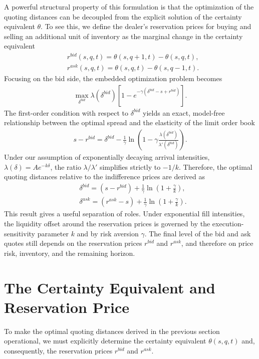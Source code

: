 \documentclass[a4paper,10pt,titlepage,oneside,openany]{book}
\theoremstyle{plain}\newtheorem{theorem}{Theorem}[chapter]
\theoremstyle{definition}\newtheorem{definition}{Definition}[chapter]
\theoremstyle{remark}\newtheorem{remark}{Remark}[chapter]
\begin{document}
A powerful structural property of this formulation is that the optimization of the quoting distances can be decoupled from the explicit solution of the certainty equivalent $\theta$. To see this, we define the dealer's reservation prices for buying and selling an additional unit of inventory as the marginal change in the certainty equivalent
\begin{align*}
    &r^{bid}(s,q,t) = \theta(s,q+1,t) - \theta(s,q,t),\\
    &r^{ask}(s,q,t) = \theta(s,q,t) - \theta(s,q-1,t).
\end{align*}
Focusing on the bid side, the embedded optimization problem becomes 
\begin{align*}
    \max_{\delta^{bid}} \lambda(\delta^{bid}) [1 - e^{-\gamma(\delta^{bid} - s + r^{bid})}].
\end{align*}
The first-order condition with respect to $\delta^{bid}$ yields an exact, model-free relationship between the optimal spread and the elasticity of the limit order book
\begin{align*}
    s - r^{bid} =\delta^{bid} - \frac{1}{\gamma} \ln \left( 1 - \gamma \frac{\lambda(\delta^{bid})}{\lambda'(\delta^{bid})} \right).
\end{align*}
Under our assumption of exponentially decaying arrival intensities, $\lambda(\delta) = A e^{-k\delta}$, the ratio $\lambda / \lambda'$ simplifies strictly to $-1/k$. Therefore, the optimal quoting distances relative to the indifference prices are derived as
\begin{align*}
    &\delta^{bid} = (s - r^{bid}) + \frac{1}{\gamma} \ln \left( 1 + \frac{\gamma}{k} \right),\\
    &\delta^{ask} = (r^{ask} - s) + \frac{1}{\gamma} \ln \left( 1 + \frac{\gamma}{k} \right).
\end{align*}
This result gives a useful separation of roles. Under exponential fill intensities, the liquidity offset around the reservation prices is governed by the execution-sensitivity parameter $k$ and by risk aversion $\gamma$. The final level of the bid and ask quotes still depends on the reservation prices $r^{bid}$ and $r^{ask}$, and therefore on price risk, inventory, and the remaining horizon.

\section{The Certainty Equivalent and Reservation Price}
To make the optimal quoting distances derived in the previous section operational, we must explicitly determine the certainty equivalent $\theta(s,q,t)$ and, consequently, the reservation prices $r^{bid}$ and $r^{ask}$. 
\end{document}
